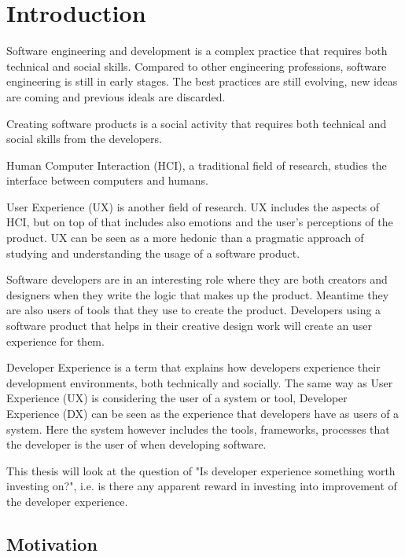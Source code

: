 \documentclass[english, 12pt, a4paper, sci, utf8, a-1b, online]{aaltothesis}
\begin{document}
\cleardoublepage
\section{Introduction}

Software engineering and development is a complex practice that requires both technical and social skills. Compared to other engineering professions, software engineering is still in early stages. The best practices are still evolving, new ideas are coming and previous ideals are discarded.

Creating software products is a social activity that requires both technical and social skills from the developers.

Human Computer Interaction (HCI), a traditional field of research, studies the interface between computers and humans.

User Experience (UX) is another field of research. UX includes the aspects of HCI, but on top of that includes also emotions and the user's perceptions of the product. UX can be seen as a more hedonic than a pragmatic approach of studying and understanding the usage of a software product.

Software developers are in an interesting role where they are both creators and designers when they write the logic that makes up the product. Meantime they are also users of tools that they use to create the product. Developers using a software product that helps in their creative design work will create an user experience for them.

Developer Experience is a term that explains how developers experience their development environments, both technically and socially. The same way as User Experience (UX) is considering the user of a system or tool, Developer Experience (DX) can be seen as the experience that developers have as users of a system. Here the system however includes the tools, frameworks, processes that the developer is the user of when developing software.

This thesis will look at the question of "Is developer experience something worth investing on?", i.e. is there any apparent reward in investing into improvement of the developer experience.

\thispagestyle{empty}

\subsection{Motivation}
\end{document}

